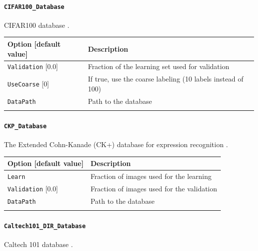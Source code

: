 \documentclass[a4paper,11pt,oneside]{article}
\begin{document}
\paragraph{\texorpdfstring{%
\lstinline[basicstyle=\ttfamily\bfseries]!CIFAR100_Database!}
{CIFAR100\_Database}}
CIFAR100 database \citep{Krizhevsky2009}.

\begin{center}
 \begin{tabular}{| p{5cm} | p{10cm} | }
 \hline
 Option [default value] & Description\\
 \hline\hline
  \lstinline!Validation! [0.0] & Fraction of the learning set used for
  validation \\
  \lstinline!UseCoarse! [0] & If true, use the coarse labeling
  (10 labels instead of 100) \\
  \lstinline!DataPath! & Path to the database \\
    & \\
 \hline
\end{tabular}
\end{center}

\paragraph{\texorpdfstring{%
\lstinline[basicstyle=\ttfamily\bfseries]!CKP_Database!}{CKP\_Database}}
The Extended Cohn-Kanade (CK+) database for expression recognition
\citep{Lucey2010}.

\begin{center}
 \begin{tabular}{| p{5cm} | p{10cm} | }
 \hline
 Option [default value] & Description\\
 \hline\hline
  \cellcolor{requiredcolor}
  \lstinline!Learn! & Fraction of images used for the learning \\
  \lstinline!Validation! [0.0] & Fraction of images used for the validation \\
  \lstinline!DataPath! & Path to the database \\
  \noindent [\lstinline!$N2D2_DATA!/cohn-kanade-images] & \\
 \hline
\end{tabular}
\end{center}


\paragraph{\texorpdfstring{\lstinline[basicstyle=\ttfamily\bfseries]!Caltech101_DIR_Database!}{Caltech101\_DIR\_Database}}
Caltech 101 database \citep{FeiFei2004}.
\end{document}
